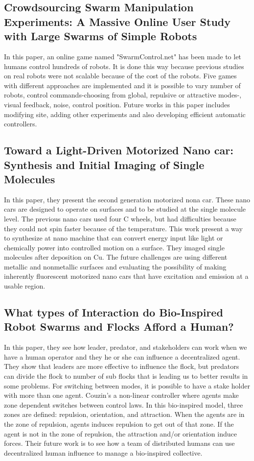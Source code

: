 \documentclass[letterpaper, 10 pt, conference]{ieeeconf}
\begin{document}
\subsection{Crowdsourcing Swarm Manipulation Experiments: A Massive Online User Study with Large Swarms of Simple Robots}

In this paper, an online game named "SwarmControl.net" has been made to let humans control hundreds of robots. It is done this way because previous studies on real robots were not scalable because of the cost of the robots. Five games with different approaches are implemented and it is possible to vary number of robots, control commands-choosing from global, repulsive or attractive modes-, visual feedback, noise, control position. Future works in this paper includes modifying site, adding other experiments and also developing efficient automatic controllers. \cite{swarmcontrol2013}

\subsection{Toward a Light-Driven Motorized Nano car: Synthesis and Initial Imaging of Single Molecules}

In this paper, they present the second generation motorized nona car. These nano cars are designed to operate on surfaces and to be studied at the single molecule level. The previous nano cars used four C wheels, but had difficulties because they could not spin faster because of the temperature. This work present a way to synthesize at nano machine that can convert energy input like light or chemically power into controlled motion on a surface. They imaged single molecules after deposition on Cu. The future challenges are using different metallic and nonmetallic surfaces and evaluating the possibility of making inherently fluorescent motorized nano cars that have excitation and emission at a usable region. \cite{TourNanocar2012}

\subsection{What types of Interaction do Bio-Inspired Robot Swarms and Flocks Afford a Human?}

In this paper, they see how leader, predator, and stakeholders can work when we have a human operator and they he or she can influence a decentralized agent. They show that leaders are more effective to influence the flock, but predators can divide the flock to number of sub flocks that is leading us to better results in some problems. For switching between modes, it is possible to have a stake holder with more than one agent. Couzin's a non-linear controller where agents make zone dependent switches between control laws. In this bio-inspired model, three zones are defined: repulsion, orientation, and attraction. When the agents are in the zone of repulsion, agents induces repulsion to get out of that zone. If the agent is not in the zone of repulsion, the attraction and/or orientation induce forces. Their future work is to see how a team of distributed humans can use decentralized human influence to manage a bio-inspired collective.\cite{Goodrich2012}
\end{document}
